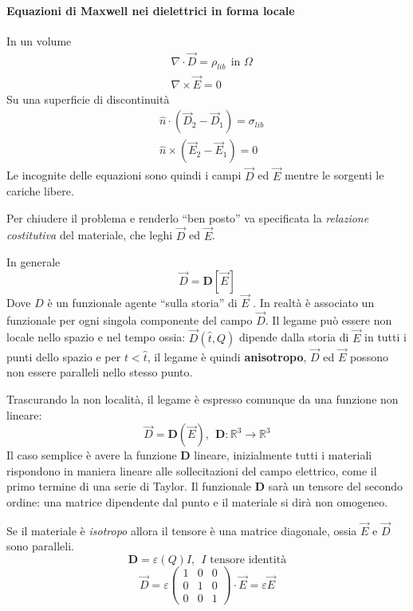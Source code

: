\paragraph{Equazioni di Maxwell nei dielettrici in forma locale}
In un volume
\begin{align*}
&\nabla \cdot\vec{D} = \rho_{lib}\ \ \text{in }\Omega\\
&\nabla \times \vec{E} = 0
\end{align*}
Su una superficie di discontinuità
\begin{align*}
&\hat{n}\cdot\left(\vec{D}_2-\vec{D}_1\right) = \sigma_{lib}\\
&\hat{n}\times\left(\vec{E}_2-\vec{E}_1\right) = 0
\end{align*}
Le incognite delle equazioni sono quindi i campi $\vec{D}$ ed 
$\vec{E}$ mentre le sorgenti le cariche libere.

Per chiudere il problema e renderlo ``ben posto'' va specificata
la \textit{relazione costitutiva} del materiale, che leghi
$\vec{D}$ ed $\vec{E}$.

In generale
$$
\vec{D} = \mathbf{D}[\vec{E}]
$$
Dove $D$ è un funzionale agente ``sulla storia'' di $\vec{E}$ 
.
In realtà è associato un funzionale per ogni singola componente
del campo $\vec{D}$.
Il legame può essere non locale nello spazio e nel tempo ossia:
$\vec{D}(\hat{t},Q)$ dipende dalla storia di $\vec{E}$ in tutti 
i punti dello spazio e per $t < \hat{t}$, il legame è quindi
\textbf{anisotropo}, $\vec{D}$ ed $\vec{E}$ possono non essere
paralleli nello stesso punto.

Trascurando la non località, il legame è espresso comunque da una 
funzione non lineare:
$$
\vec{D} = \mathbf{D}(\vec{E}),\ \ \mathbf{D}: \mathbb{R}^3 \to \mathbb{R}^3
$$
Il caso semplice è avere la funzione $\mathbf{D}$ lineare, 
inizialmente tutti i materiali rispondono in 
maniera lineare alle sollecitazioni del campo elettrico, come
il primo termine di una serie di Taylor. Il funzionale $\mathbf{D}$ 
sarà un tensore del secondo ordine: una matrice dipendente dal 
punto e il materiale si dirà non omogeneo.

Se il materiale è \textit{isotropo} allora il tensore è una matrice
diagonale, ossia $\vec{E}$ e $\vec{D}$ sono paralleli.
$$
\mathbf{D} = \varepsilon(Q)I,\ \ I\text{ tensore identità}
$$
$$
\vec{D} = \varepsilon \begin{pmatrix}
                       1 & 0 & 0 \\
                       0 & 1 & 0 \\
                       0 & 0 & 1
                      \end{pmatrix} \cdot \vec{E} = \varepsilon\vec{E}
$$

